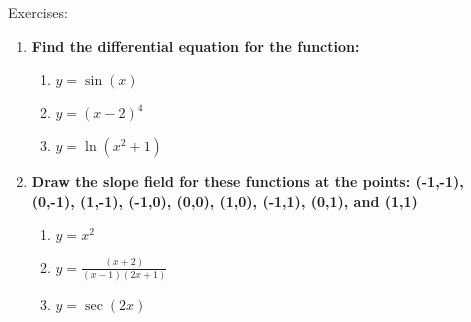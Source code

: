 \documentclass[../revisedmain.tex]{subfiles}
\begin{document}
\newpage
\begin{center}
	\LARGE Exercises:
\end{center}
\begin{enumerate}
	\item \textbf{Find the differential equation for the function:}
	\begin{enumerate}
		\item $y=\sin(x)$
		\item $y=(x-2)^4$
		\item $y=\ln(x^2+1)$
	\end{enumerate}
	\item \textbf{Draw the slope field for these functions at the points: (-1,-1), (0,-1), (1,-1), (-1,0), (0,0), (1,0), (-1,1), (0,1), and (1,1)}
	\begin{enumerate}
		\item $y=x^2$
		\item $y=\displaystyle\frac{(x+2)}{(x-1)(2x+1)}$
		\item $y=\sec(2x)$
	\end{enumerate}
\end{enumerate}
\end{document}

